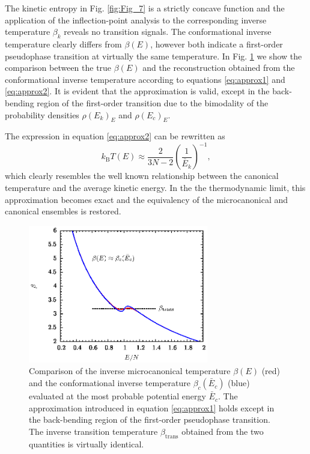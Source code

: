 \documentclass[12pt]{report}
\begin{document}
The kinetic entropy in Fig. \ref{fig:Fig_7} is a strictly concave function and the application of the inflection-point analysis to the corresponding inverse temperature $\beta_{k}$ reveals no transition signals. The conformational inverse temperature clearly differs from $\beta(E)$, however both indicate a first-order pseudophase transition at virtually the same temperature. In Fig. \ref{fig:Fig_8} we show the comparison between the true $\beta(E)$ and the reconstruction obtained from the conformational inverse temperature according to equations \ref{eq:approx1} and \ref{eq:approx2}. It is evident that the approximation is valid, except in the back-bending region of the first-order transition due to the bimodality of the probability densities $\rho(E_{k})_{E}$ and $\rho(E_{c})_{E}$. 

\newpage
The expression in equation \ref{eq:approx2} can be rewritten as 
\begin{equation}
k_{\mathrm{B}}T(E) \approx \frac{2}{3N-2}\left(\frac{1}{\bar{E}_{k}}\right)^{-1},
\end{equation}
which clearly resembles the well known relationship between the canonical temperature and the average kinetic energy. In the the thermodynamic limit, this approximation becomes exact and the equivalency of the microcanonical and canonical ensembles is restored. 



\begin{figure}
\center
\includegraphics[width = 0.7\textwidth]{chapter2Figs/N55BetaComp.eps}
\caption{\label{fig:Fig_8}%
Comparison of the inverse microcanonical temperature $\beta(E)$ (red) and the conformational inverse temperature $\beta_{c}(\bar{E}_{c})$ (blue) evaluated at the most probable potential energy $\bar{E}_{c}$. The approximation introduced in equation \ref{eq:approx1} holds except in the back-bending region of the first-order pseudophase transition. The inverse transition temperature $\beta_{\mathrm{trans}}$ obtained from the two quantities is virtually identical.}
\end{figure}
\end{document}
